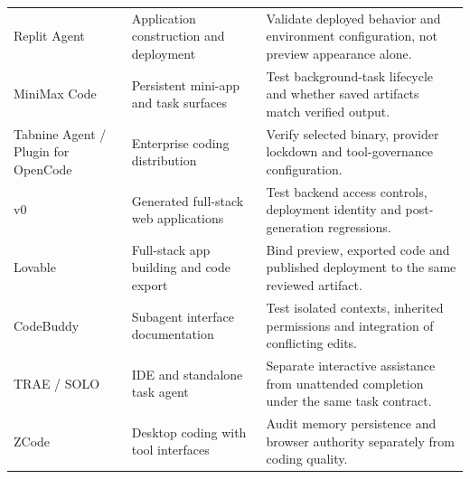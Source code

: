 \begin{longtable}{L{25mm}L{35mm}L{48mm}}
Replit Agent\cite{executionproduct074} & Application construction and deployment & Validate deployed behavior and environment configuration, not preview appearance alone. \\
MiniMax Code\cite{executionproduct075} & Persistent mini-app and task surfaces & Test background-task lifecycle and whether saved artifacts match verified output. \\
Tabnine Agent / Plugin for OpenCode\cite{executionproduct086,cumb2026tabnineopencode} & Enterprise coding distribution & Verify selected binary, provider lockdown and tool-governance configuration. \\
v0\cite{executionproduct087} & Generated full-stack web applications & Test backend access controls, deployment identity and post-generation regressions. \\
Lovable\cite{cumb2026lovable} & Full-stack app building and code export & Bind preview, exported code and published deployment to the same reviewed artifact. \\
CodeBuddy\cite{executionproduct095} & Subagent interface documentation & Test isolated contexts, inherited permissions and integration of conflicting edits. \\
TRAE / SOLO\cite{executionproduct096} & IDE and standalone task agent & Separate interactive assistance from unattended completion under the same task contract. \\
ZCode\cite{executionproduct097} & Desktop coding with tool interfaces & Audit memory persistence and browser authority separately from coding quality. \\
\bottomrule\end{longtable}
\endgroup
